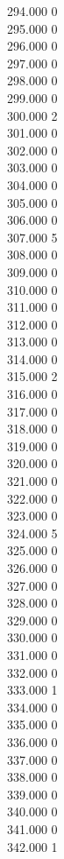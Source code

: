 { 294.000	0 \\
 295.000	0 \\
 296.000	0 \\
 297.000	0 \\
 298.000	0 \\
 299.000	0 \\
 300.000	2 \\
 301.000	0 \\
 302.000	0 \\
 303.000	0 \\
 304.000	0 \\
 305.000	0 \\
 306.000	0 \\
 307.000	5 \\
 308.000	0 \\
 309.000	0 \\
 310.000	0 \\
 311.000	0 \\
 312.000	0 \\
 313.000	0 \\
 314.000	0 \\
 315.000	2 \\
 316.000	0 \\
 317.000	0 \\
 318.000	0 \\
 319.000	0 \\
 320.000	0 \\
 321.000	0 \\
 322.000	0 \\
 323.000	0 \\
 324.000	5 \\
 325.000	0 \\
 326.000	0 \\
 327.000	0 \\
 328.000	0 \\
 329.000	0 \\
 330.000	0 \\
 331.000	0 \\
 332.000	0 \\
 333.000	1 \\
 334.000	0 \\
 335.000	0 \\
 336.000	0 \\
 337.000	0 \\
 338.000	0 \\
 339.000	0 \\
 340.000	0 \\
 341.000	0 \\
 342.000	1 \\
}
